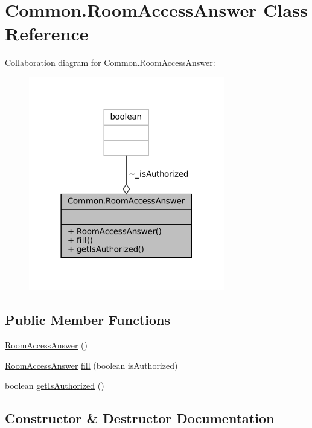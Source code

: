 \hypertarget{classCommon_1_1RoomAccessAnswer}{}\section{Common.\+Room\+Access\+Answer Class Reference}
\label{classCommon_1_1RoomAccessAnswer}


Collaboration diagram for Common.\+Room\+Access\+Answer\+:
\nopagebreak
\begin{figure}[H]
\begin{center}
\leavevmode
\includegraphics[width=242pt]{classCommon_1_1RoomAccessAnswer__coll__graph}
\end{center}
\end{figure}
\subsection*{Public Member Functions}
\begin{DoxyCompactItemize}
\item 
\mbox{\hyperlink{classCommon_1_1RoomAccessAnswer_a5127909913534ac7fe5ba604bd5bcf80}{Room\+Access\+Answer}} ()
\item 
\mbox{\hyperlink{classCommon_1_1RoomAccessAnswer}{Room\+Access\+Answer}} \mbox{\hyperlink{classCommon_1_1RoomAccessAnswer_abda9141bb331155f3cec2575a1b948c3}{fill}} (boolean is\+Authorized)
\item 
boolean \mbox{\hyperlink{classCommon_1_1RoomAccessAnswer_aca54d5af45356088e89548f3d7f2e137}{get\+Is\+Authorized}} ()
\end{DoxyCompactItemize}


\subsection{Constructor \& Destructor Documentation}
\mbox{\label{classCommon_1_1RoomAccessAnswer_a5127909913534ac7fe5ba604bd5bcf80}} 
